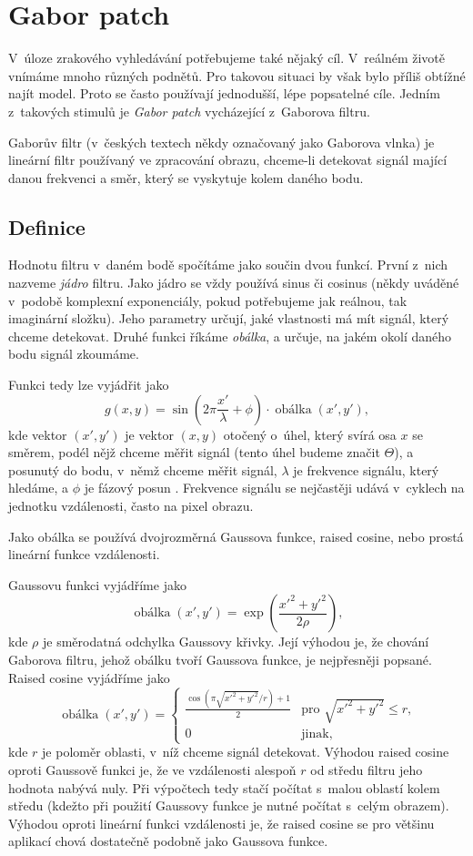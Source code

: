 \section{Gabor patch}


V~úloze zrakového vyhledávání potřebujeme také nějaký cíl. V~reálném životě
vnímáme mnoho různých podnětů. Pro takovou situaci by však bylo příliš obtížné
najít model. Proto se často používají jednodušší, lépe popsatelné cíle.  Jedním z~takových
stimulů je {\it Gabor patch} vycházející z~Gaborova filtru.

Gaborův filtr (v~českých textech někdy označovaný jako Gaborova vlnka) je
lineární filtr používaný ve zpracování obrazu, chceme-li detekovat signál
mající danou frekvenci a směr, který se vyskytuje kolem daného bodu.

\subsection{Definice}

Hodnotu filtru v~daném bodě spočítáme jako součin dvou funkcí. První z~nich
nazveme {\it jádro} filtru. Jako jádro se vždy používá sinus či cosinus (někdy
uváděné v~podobě komplexní exponenciály, pokud potřebujeme jak reálnou, tak
imaginární složku). Jeho parametry určují, jaké vlastnosti má mít signál, který
chceme detekovat. Druhé funkci říkáme {\it obálka}, a určuje, na jakém okolí daného
bodu signál zkoumáme.

Funkci tedy lze vyjádřit jako $$g(x,y) =
\sin\left(2\pi\frac{x'}{\lambda}+\phi\right)\cdot\operatorname{obálka}(x',y'),$$
kde vektor $(x',y')$ je vektor $(x,y)$ otočený o~úhel, který svírá osa $x$
se směrem, podél nějž chceme měřit signál (tento úhel budeme značit $\Theta$),
a posunutý do bodu, v~němž chceme měřit signál, $\lambda$ je frekvence signálu,
který hledáme, a $\phi$ je fázový posun \citep{GaborPatch}. Frekvence signálu
se nejčastěji udává v~cyklech na jednotku vzdálenosti, často na pixel obrazu.

Jako obálka se používá dvojrozměrná Gaussova funkce, raised cosine, nebo prostá
lineární funkce vzdálenosti. 

Gaussovu funkci vyjádříme jako $$ \operatorname{obálka}(x',y') =
\exp\left(\frac{x'^2 + y'^2}{2\rho}\right),$$ kde $\rho$ je směrodatná odchylka
Gaussovy křivky. Její výhodou je, že chování Gaborova filtru, jehož obálku tvoří
Gaussova funkce, je nejpřesněji popsané. Raised cosine vyjádříme jako 
$$
\operatorname{obálka}(x',y')=
\begin{cases}
 \frac{\cos(\pi\sqrt{x'^2+y'^2}/r)+1}2 &\text{pro $\sqrt{x'^2+y'^2}\leq r$,}\\[1ex]
 0 &\text{jinak,}
\end{cases}
$$ kde $r$ je poloměr oblasti, v~níž chceme signál detekovat. Výhodou raised
cosine oproti Gaussově funkci je, že ve vzdálenosti alespoň $r$ od středu
filtru jeho hodnota nabývá nuly. Při výpočtech tedy stačí počítat s~malou
oblastí kolem středu (kdežto při použití Gaussovy funkce je nutné počítat
s~celým obrazem). Výhodou oproti lineární funkci vzdálenosti je, že raised cosine
se pro většinu aplikací chová dostatečně podobně jako Gaussova funkce.

